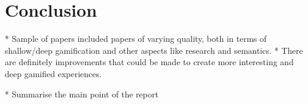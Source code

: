 \section{Conclusion}
* Sample of papers included papers of varying quality, both in terms of shallow/deep gamification and other aspects like research and semantics.
* There are definitely improvements that could be made to create more interesting and deep gamified experiences. 


* Summarise the main point of the report